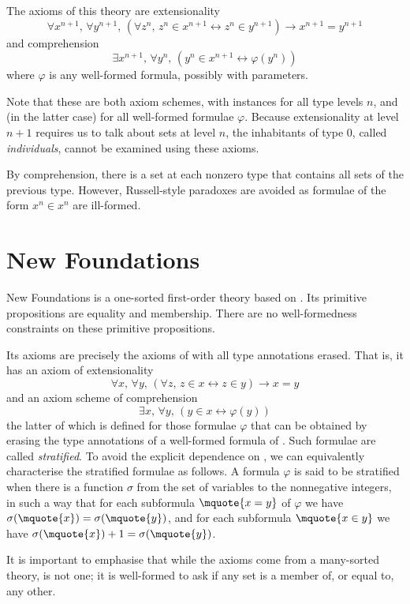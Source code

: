 The axioms of this theory are extensionality
\[ \forall x^{n + 1},\, \forall y^{n + 1},\, (\forall z^n,\, z^n \in x^{n+1} \leftrightarrow z^n \in y^{n+1}) \to x^{n+1} = y^{n+1} \]
and comprehension
\[ \exists x^{n + 1},\, \forall y^n,\, (y^n \in x^{n+1} \leftrightarrow \varphi(y^n)) \]
where \( \varphi \) is any well-formed formula, possibly with parameters.

Note that these are both axiom schemes, with instances for all type levels \( n \), and (in the latter case) for all well-formed formulae \( \varphi \).
Because extensionality at level \( n + 1 \) requires us to talk about sets at level \( n \), the inhabitants of type 0, called \emph{individuals}, cannot be examined using these axioms.

By comprehension, there is a set at each nonzero type that contains all sets of the previous type.
However, Russell-style paradoxes are avoided as formulae of the form \( x^n \in x^n \) are ill-formed.

\section{New Foundations}

New Foundations is a one-sorted first-order theory based on {\TST}.
Its primitive propositions are equality and membership.
There are no well-formedness constraints on these primitive propositions.

Its axioms are precisely the axioms of {\TST} with all type annotations erased.
That is, it has an axiom of extensionality
\[ \forall x,\, \forall y,\, (\forall z,\, z \in x \leftrightarrow z \in y) \to x = y \]
and an axiom scheme of comprehension
\[ \exists x,\, \forall y,\, (y \in x \leftrightarrow \varphi(y)) \]
the latter of which is defined for those formulae \( \varphi \) that can be obtained by erasing the type annotations of a well-formed formula of {\TST}.
Such formulae are called \emph{stratified}.
To avoid the explicit dependence on {\TST}, we can equivalently characterise the stratified formulae as follows.
A formula \( \varphi \) is said to be stratified when there is a function \( \sigma \) from the set of variables to the nonnegative integers, in such a way that for each subformula \( \mquote{x = y} \) of \( \varphi \) we have \( \sigma(\mquote{x}) = \sigma(\mquote{y}) \), and for each subformula \( \mquote{x \in y} \) we have \( \sigma(\mquote{x}) + 1 = \sigma(\mquote{y}) \).

It is important to emphasise that while the axioms come from a many-sorted theory, {\NF} is not one; it is well-formed to ask if any set is a member of, or equal to, any other.

